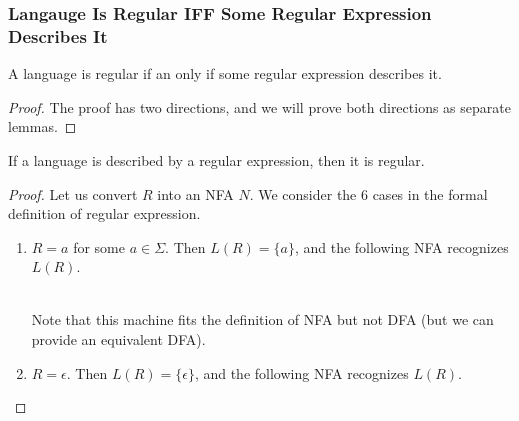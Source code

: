 \documentclass[11pt,a4paper]{article}
\begin{document}
\subsubsection{Langauge Is Regular IFF Some Regular Expression Describes It}
\begin{theorem}
    A language is regular if an only if some regular expression describes it.

    \begin{proof}
        The proof has two directions, and we will prove both directions as separate lemmas.
    \end{proof}
\end{theorem}

\begin{lemma}
    If a language is described by a regular expression, then it is regular.

    \begin{proof}
        Let us convert $R$ into an NFA $N$. We consider the 6 cases in the formal definition of regular expression.
        \begin{enumerate}
            \item $R=a$ for some $a\in\Sigma$. Then $L(R)=\{a\}$, and the following NFA recognizes $L(R)$. \\
            
             \\

            Note that this machine fits the definition of NFA but not DFA (but we can provide an equivalent DFA).

            \item $R=\epsilon$. Then $L(R)=\{\epsilon\}$, and the following NFA recognizes $L(R)$. \\
            
\end{enumerate}
\end{proof}
\end{lemma}
\end{document}
